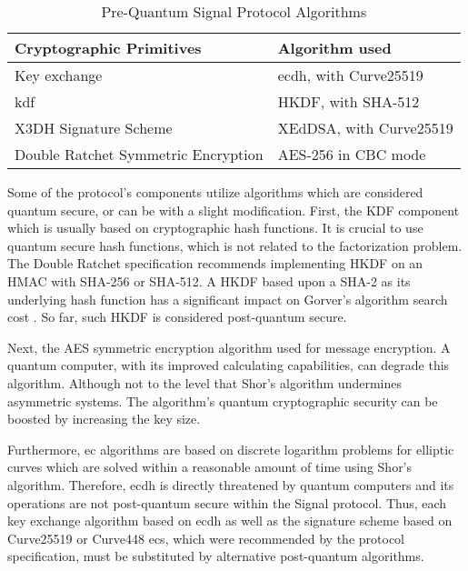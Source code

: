 \begin{table}[htbp]
	\centering
	\caption{Pre-Quantum Signal Protocol Algorithms}
	\label{tab:signal-alg}
	\begin{tabular}{!{\color{black}\vrule}l!{\color{black}\vrule}l!{\color{black}\vrule}} 
		\hline
			Cryptographic Primitives            & Algorithm used           \\ 
		\hline
		\hline
		Key exchange                        & \acrshort{ecdh}, with Curve25519    \\ 
		\hline
		\gls{kdf}                           & HKDF, with SHA-512       \\ 
		\hline
		X3DH Signature Scheme               & XEdDSA, with Curve25519  \\ 
		\hline
		Double Ratchet Symmetric Encryption & AES-256 in CBC mode      \\
		\hline
	\end{tabular}
\end{table}
Some of the protocol's components utilize algorithms which are considered quantum secure, or can be with a slight modification.
First, the KDF component which is usually based on cryptographic hash functions. It is crucial to use quantum secure hash functions, which is not related to the factorization problem. The Double Ratchet specification recommends implementing HKDF on an HMAC with SHA-256 or SHA-512. A HKDF based upon a SHA-2 as its underlying hash function has a significant impact on Gorver's algorithm search cost \cite{bogomolec2019towards}. So far, such HKDF is considered post-quantum secure.
\par
Next, the AES symmetric encryption algorithm used for message encryption. A quantum computer, with its improved calculating capabilities, can degrade this algorithm. Although not to the level that Shor's algorithm undermines asymmetric systems. The algorithm's quantum cryptographic security can be boosted by increasing the key size.
\par
Furthermore, \gls{ec} algorithms are based on discrete logarithm problems for elliptic curves which are solved within a reasonable amount of time using Shor’s algorithm. Therefore, \gls{ecdh} is directly threatened by quantum computers and its operations are not post-quantum secure within the Signal protocol. Thus, each key exchange algorithm based on \gls{ecdh} as well as the signature scheme based on Curve25519 or Curve448 \glspl{ec}, which were recommended by the protocol specification, must be substituted by alternative post-quantum algorithms. 

